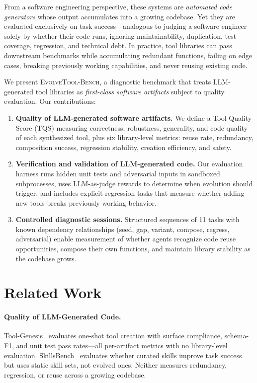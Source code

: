 \documentclass[10pt,twocolumn]{article}
\begin{document}
From a software engineering perspective, these systems are \emph{automated code generators} whose output accumulates into a growing codebase. Yet they are evaluated exclusively on task success---analogous to judging a software engineer solely by whether their code runs, ignoring maintainability, duplication, test coverage, regression, and technical debt. In practice, tool libraries can pass downstream benchmarks while accumulating redundant functions, failing on edge cases, breaking previously working capabilities, and never reusing existing code.

We present \textsc{EvolveTool-Bench}, a diagnostic benchmark that treats LLM-generated tool libraries as \emph{first-class software artifacts} subject to quality evaluation. Our contributions:

\begin{enumerate}
\item \textbf{Quality of LLM-generated software artifacts.} We define a Tool Quality Score (TQS) measuring correctness, robustness, generality, and code quality of each synthesized tool, plus six library-level metrics: reuse rate, redundancy, composition success, regression stability, creation efficiency, and safety.

\item \textbf{Verification and validation of LLM-generated code.} Our evaluation harness runs hidden unit tests and adversarial inputs in sandboxed subprocesses, uses LLM-as-judge rewards to determine when evolution should trigger, and includes explicit regression tasks that measure whether adding new tools breaks previously working behavior.

\item \textbf{Controlled diagnostic sessions.} Structured sequences of 11 tasks with known dependency relationships (seed, gap, variant, compose, regress, adversarial) enable measurement of whether agents recognize code reuse opportunities, compose their own functions, and maintain library stability as the codebase grows.
\end{enumerate}

\section{Related Work}

\paragraph{Quality of LLM-Generated Code.} Tool-Genesis~\cite{xia2026toolgenesis} evaluates one-shot tool creation with surface compliance, schema-F1, and unit test pass rates---all per-artifact metrics with no library-level evaluation. SkillsBench~\cite{skillsbench2026} evaluates whether curated skills improve task success but uses static skill sets, not evolved ones. Neither measures redundancy, regression, or reuse across a growing codebase.
\end{document}
